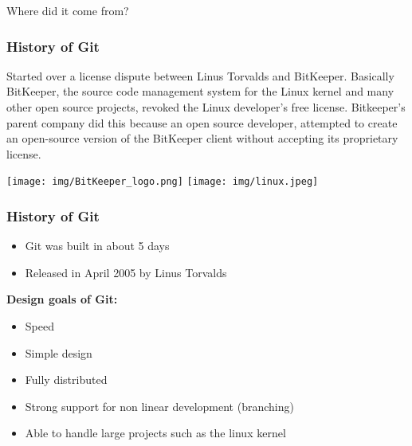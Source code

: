 \documentclass{beamer}
\begin{document}
\begin{frame}{Where did it come from?}
	\frametitle{\textbf{History of Git}}
	
	Started over a license dispute between Linus Torvalds and BitKeeper. Basically
BitKeeper, the source code management system for the Linux kernel and many other open source projects, revoked the Linux developer’s free license. Bitkeeper’s parent company did this because an open source developer, attempted to create an open-source version of the BitKeeper client without accepting its proprietary license.

	\begin{center}
		\texttt{[image: img/BitKeeper\_logo.png]} 
		\hspace{1cm}
		\texttt{[image: img/linux.jpeg]} 
	\end{center}

\end{frame}

\begin{frame}
	\frametitle{\textbf{History of Git}}

\begin{itemize}
\item Git was built in about 5 days
\item Released in April 2005 by Linus Torvalds 
\end{itemize}

\vspace{0.5cm}
\textbf{Design goals of Git:}
 
\begin{itemize}
\item Speed 
\item Simple design 
\item Fully distributed 
\item Strong support for non linear development (branching)
\item Able to handle large projects such as the linux kernel 
\end{itemize}

\end{frame}
\end{document}

